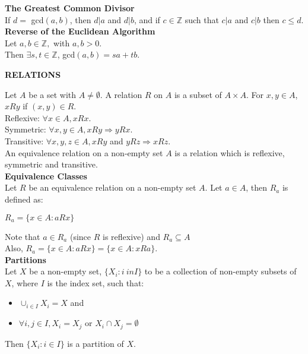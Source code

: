 \documentclass[a4paper]{article}
\begin{document}
\begin{multicols}{2}
\begin{framed}
	\noindent
	\textbf{The Greatest Common Divisor}\\
	If $d = $ gcd$(a, b)$, then $d \vert a$ and $d \vert b$, and if $c \in \mathbb{Z}$ such that $c \vert a$ and $c \vert b$ then $c \leq d$.\\
	
	\noindent
	\textbf{Reverse of the Euclidean Algorithm}\\
	Let $a,b \in \mathbb{Z},$ with $a,b >0$.\\
	Then $\exists s,t \in \mathbb{Z}$, gcd$(a,b) = sa+tb$.
\end{framed}

\begin{framed}
	\begin{center}
		\textbf{\textsc{RELATIONS}}
	\end{center}
		Let $A$ be a set with $A \neq \emptyset$. A relation $R$ on $A$ is a subset of $A \times A$. For $x, y\in A$, $x R y$ if $(x, y)\in R$.\\	

	\noindent
	Reflexive: $\forall x \in A, xRx$.\\
	Symmetric: $\forall x, y \in A, xRy \Rightarrow yRx$.\\
	Transitive: $\forall x, y, z \in A, xRy$ and $yRz \Rightarrow xRz$.\\
	
	\noindent
	An equivalence relation on a non-empty set $A$ is a relation which is reflexive, symmetric and transitive.\\
	
	\noindent
	\textbf{Equivalence Classes}\\
	Let $R$ be an equivalence relation on a non-empty set $A$. Let $a \in A$, then $R_a$ is defined as:
	\begin{center}
		$R_a = \{x \in A : aRx\}$
	\end{center}
	Note that $a \in R_a$ (since $R$ is reflexive) and $R_a \subseteq A$\\
	Also, $R_a = \{x \in A: aRx\} = \{x \in A: xRa\}$.\\
	
	\noindent
	\textbf{Partitions}\\
	Let $X$ be a non-empty set, $\{X_i:i\ in I\}$ to be a collection of non-empty subsets of $X$, where $I$ is the index set, such that:
	\begin{itemize}
		\item $\cup_{i\in I}X_i = X$ and
		\item $\forall i,j \in I, X_i = X_j$ or $X_i \cap X_j = \emptyset$
	\end{itemize}
	Then $\{X_i : i \in I\}$ is a partition of $X$.\\
	

\end{framed}
\end{multicols}
\end{document}
